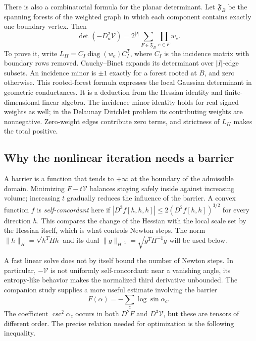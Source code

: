 There is also a combinatorial formula for the planar determinant. Let
$\mathfrak F_B$ be the spanning forests of the weighted graph in which
each component contains exactly one boundary vertex. Then
\begin{equation}
 \boxed{\det(-D_u^2\mathcal V)
      =2^{|I|}\sum_{F\in\mathfrak F_B}\prod_{e\in F}w_e.}
 \label{eq:ipolyForestDeterminant}
\end{equation}
To prove it, write $L_{II}=C_I\operatorname{diag}(w_e)C_I^T$, where
$C_I$ is the incidence matrix with boundary rows removed. Cauchy--Binet
expands its determinant over $|I|$-edge subsets. An incidence minor is
$\pm1$ exactly for a forest rooted at $B$, and zero otherwise. This
rooted-forest formula expresses the local Gaussian determinant in
geometric conductances. It is a deduction from the Hessian identity
and finite-dimensional linear algebra. The incidence-minor identity
holds for real signed weights as well; in the Delaunay Dirichlet problem
its contributing weights are nonnegative. Zero-weight edges contribute
zero terms, and strictness of $L_{II}$ makes the total positive.

\subsection{Why the nonlinear iteration needs a barrier}
\label{subsec:ipolyBarrierComplexity}

A barrier is a function that tends to $+\infty$ at the boundary
of the admissible domain. Minimizing $F-t\mathcal V$ balances
staying safely inside against increasing volume; increasing $t$
gradually reduces the influence of the barrier. A convex function
$f$ is \emph{self-concordant} here if
$|D^3f[h,h,h]|\le2(D^2f[h,h])^{3/2}$ for every direction $h$.
This compares the change of the Hessian with the local scale set
by the Hessian itself, which is what controls Newton steps.
The norm $\|h\|_H=\sqrt{h^THh}$ and its dual
$\|g\|_{H^{-1}}=\sqrt{g^TH^{-1}g}$ will be used below.

A fast linear solve does not by itself bound the number of Newton
steps. In particular, $-\mathcal V$ is not uniformly self-concordant:
near a vanishing angle, its entropy-like behavior makes the normalized
third derivative unbounded. The companion study supplies a more useful
estimate involving the barrier
\begin{equation}
 F(\alpha)=-\sum_c\log\sin\alpha_c.
 \label{eq:ipolyBarrier}
\end{equation}
The coefficient $\csc^2\alpha_c$ occurs in both $D^2F$ and
$D^3\mathcal V$, but these are tensors of different order. The precise
relation needed for optimization is the following inequality.


